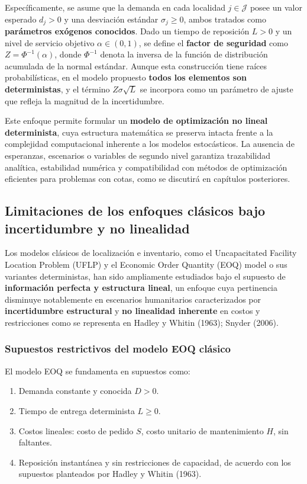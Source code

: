 \documentclass[
  spanish,
  us-letterpaper,
]{scrreprt}
\providecommand{\tightlist}{%
  \setlength{\itemsep}{0pt}\setlength{\parskip}{0pt}}
\numberwithin{equation}{section}
\begin{document}
Específicamente, se asume que la demanda en cada localidad
\(j\in\mathcal{J}\) posee un valor esperado \(d_j>0\) y una desviación
estándar \(\sigma_j\geq0\), ambos tratados como \textbf{parámetros
exógenos conocidos}. Dado un tiempo de reposición \(L>0\) y un nivel de
servicio objetivo \(\alpha\in(0,1)\), se define el \textbf{factor de
seguridad} como \(Z=\Phi^{-1}(\alpha)\), donde \(\Phi^{-1}\) denota la
inversa de la función de distribución acumulada de la normal estándar.
Aunque esta construcción tiene raíces probabilísticas, en el modelo
propuesto \textbf{todos los elementos son deterministas}, y el término
\(Z\sigma\sqrt{L}\) se incorpora como un parámetro de ajuste que refleja
la magnitud de la incertidumbre.

Este enfoque permite formular un \textbf{modelo de optimización no
lineal determinista}, cuya estructura matemática se preserva intacta
frente a la complejidad computacional inherente a los modelos
estocásticos. La ausencia de esperanzas, escenarios o variables de
segundo nivel garantiza trazabilidad analítica, estabilidad numérica y
compatibilidad con métodos de optimización eficientes para problemas con
cotas, como se discutirá en capítulos posteriores.

\subsection{Limitaciones de los enfoques clásicos bajo incertidumbre y
no linealidad}\label{sec-Nolinealidad}

Los modelos clásicos de localización e inventario, como el Uncapacitated
Facility Location Problem (UFLP) y el Economic Order Quantity (EOQ)
model o sus variantes deterministas, han sido ampliamente estudiados
bajo el supuesto de \textbf{información perfecta y estructura lineal},
un enfoque cuya pertinencia disminuye notablemente en escenarios
humanitarios caracterizados por \textbf{incertidumbre estructural} y
\textbf{no linealidad inherente} en costos y restricciones como se
representa en Hadley y Whitin (1963); Snyder (2006).

\subsubsection{Supuestos restrictivos del modelo EOQ
clásico}\label{supuestos-restrictivos-del-modelo-eoq-cluxe1sico}

El modelo EOQ se fundamenta en supuestos como:

\begin{enumerate}
\def\labelenumi{\arabic{enumi}.}
\tightlist
\item
  Demanda constante y conocida \(D>0\).
\item
  Tiempo de entrega determinista \(L \geq 0\).
\item
  Costos lineales: costo de pedido \(S\), costo unitario de
  mantenimiento \(H\), sin faltantes.
\item
  Reposición instantánea y sin restricciones de capacidad, de acuerdo
  con los supuestos planteados por Hadley y Whitin (1963).
\end{enumerate}
\end{document}

